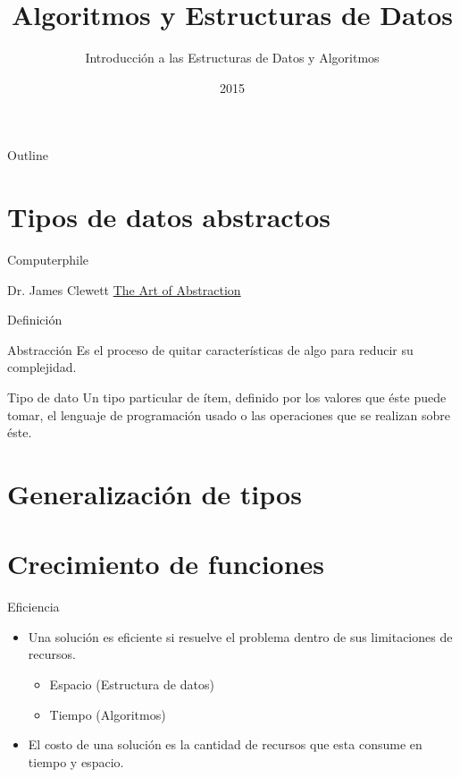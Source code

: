 \documentclass[aspectratio=169]{beamer}
\title{Algoritmos y Estructuras de Datos}
\subtitle{Introducción a las Estructuras de Datos y Algoritmos}
\date{2015}
\institute{\href{http://www.upc.edu.pe}{Universidad Peruana de Ciencias Aplicadas}}
\begin{document}
\maketitle

\begin{frame}{Outline}
  \tableofcontents
\end{frame}

\section{Tipos de datos abstractos}

\begin{frame}{Computerphile}

\begin{block}{Dr. James Clewett}
\href{https://www.youtube.com/watch?v=p7nGcY73epw}{The Art of Abstraction}
\end{block}

\end{frame}

\begin{frame}{Definición}

\begin{block}{Abstracción}
Es el proceso de quitar características de algo para reducir su complejidad.
\end{block}

\begin{block}{Tipo de dato}
Un tipo particular de ítem, definido por los valores que éste puede tomar, el lenguaje de programación usado o las operaciones que se realizan sobre éste.
\end{block}

\end{frame}

\section{Generalización de tipos}
\section{Crecimiento de funciones}

\begin{frame}{Eficiencia}
  \begin{itemize}
    \item Una solución es eficiente si resuelve el problema dentro de sus limitaciones de recursos.
    \begin{itemize}
      \item Espacio (Estructura de datos)
      \item Tiempo (Algoritmos)
    \end{itemize}
    \item El costo de una solución es la cantidad de recursos que esta consume en tiempo y espacio.
  \end{itemize}
\end{frame}
\end{document}
